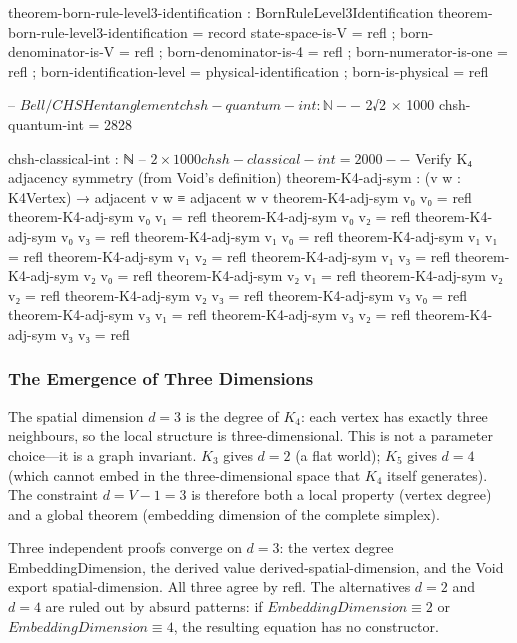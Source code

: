 \documentclass[11pt,a4paper]{book}
\def\texttt#1{#1}%
\def\text#1{#1}%
\begin{document}
\begin{code}
theorem-born-rule-level3-identification : BornRuleLevel3Identification
theorem-born-rule-level3-identification = record
  { state-space-is-V          = refl
  ; born-denominator-is-V     = refl
  ; born-denominator-is-4     = refl
  ; born-numerator-is-one     = refl
  ; born-identification-level = physical-identification
  ; born-is-physical          = refl }

-- $ Bell / CHSH entanglement
chsh-quantum-int : ℕ
-- $ 2√2 × 1000
chsh-quantum-int = 2828

chsh-classical-int : ℕ
-- $ 2 × 1000
chsh-classical-int = 2000

-- $ Verify K₄ adjacency symmetry (from Void's definition)
theorem-K4-adj-sym : (v w : K4Vertex) → adjacent v w ≡ adjacent w v
theorem-K4-adj-sym v₀ v₀ = refl
theorem-K4-adj-sym v₀ v₁ = refl
theorem-K4-adj-sym v₀ v₂ = refl
theorem-K4-adj-sym v₀ v₃ = refl
theorem-K4-adj-sym v₁ v₀ = refl
theorem-K4-adj-sym v₁ v₁ = refl
theorem-K4-adj-sym v₁ v₂ = refl
theorem-K4-adj-sym v₁ v₃ = refl
theorem-K4-adj-sym v₂ v₀ = refl
theorem-K4-adj-sym v₂ v₁ = refl
theorem-K4-adj-sym v₂ v₂ = refl
theorem-K4-adj-sym v₂ v₃ = refl
theorem-K4-adj-sym v₃ v₀ = refl
theorem-K4-adj-sym v₃ v₁ = refl
theorem-K4-adj-sym v₃ v₂ = refl
theorem-K4-adj-sym v₃ v₃ = refl
\end{code}

\subsubsection*{The Emergence of Three Dimensions}

The spatial dimension $d = 3$ is the degree of $K_4$: each vertex has
exactly three neighbours, so the local structure is three-dimensional.
This is not a parameter choice---it is a graph invariant.  $K_3$ gives
$d = 2$ (a flat world); $K_5$ gives $d = 4$ (which cannot embed in the
three-dimensional space that $K_4$ itself generates).  The constraint
$d = V - 1 = 3$ is therefore both a local property (vertex degree) and
a global theorem (embedding dimension of the complete simplex).

Three independent proofs converge on $d = 3$: the vertex degree
\texttt{EmbeddingDimension}, the derived value \texttt{derived-spatial-dimension},
and the Void export \texttt{spatial-dimension}.  All three agree by
\texttt{refl}.  The alternatives $d = 2$ and $d = 4$ are ruled out by
absurd patterns: if $\text{EmbeddingDimension} \equiv 2$ or
$\text{EmbeddingDimension} \equiv 4$, the resulting equation has no
constructor.
\end{document}
